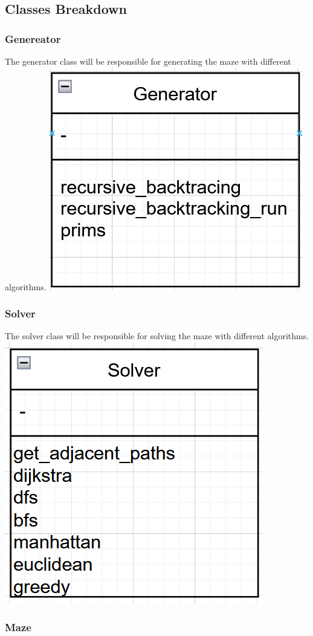 \documentclass{article}
\begin{document}
\subsection{Classes Breakdown}

\subsubsection{Genereator}

The generator class will be responsible for generating the maze with different algorithms.
\newline
\includegraphics[width=0.5\linewidth]{assets/class diagrams/generator.PNG}

\subsubsection{Solver}

The solver class will be responsible for solving the maze with different algorithms.
\newline
\includegraphics[width=0.5\linewidth]{assets/class diagrams/solver.PNG}

\subsubsection{Maze}
\end{document}

